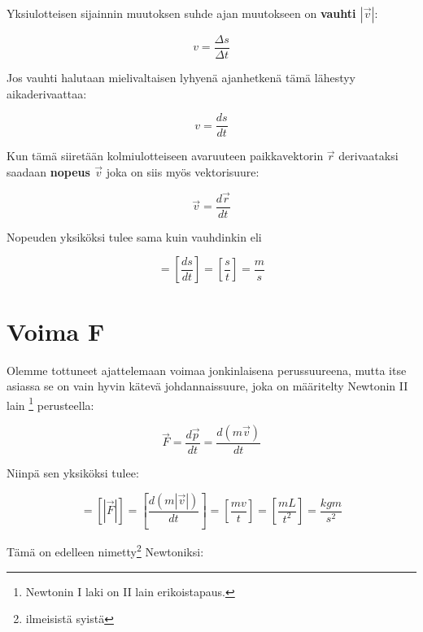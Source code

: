 \documentclass[12pt,a4paper,finnish]{book}
\begin{document}
Yksiulotteisen sijainnin muutoksen suhde ajan muutokseen on \textbf{vauhti $|\vec{v}|$}:

\begin{equation}
 v = \frac{\Delta s}{\Delta t}
\end{equation}

Jos vauhti halutaan mielivaltaisen lyhyenä ajanhetkenä tämä lähestyy aikaderivaattaa:

\begin{equation}
 v = \frac{ds}{dt}
\end{equation}

Kun tämä siiretään kolmiulotteiseen avaruuteen paikkavektorin $\vec{r}$ derivaataksi saadaan \textbf{nopeus $\vec{v}$} 
joka on siis myös vektorisuure:

\begin{equation}
 \vec{v} = \frac{d\vec{r}}{dt}
\end{equation}

Nopeuden yksiköksi tulee sama kuin vauhdinkin eli

\begin{equation}
 [v] = \left[\frac{ds}{dt}\right] = \left[\frac{s}{t}\right] = \frac{m}{s}
\end{equation}


\section{Voima F} %

Olemme tottuneet ajattelemaan voimaa jonkinlaisena perussuureena, mutta itse asiassa se on vain hyvin kätevä 
johdannaissuure, joka on määritelty Newtonin II lain \footnote{Newtonin I laki on II lain erikoistapaus.} perusteella:

\begin{equation}
 \vec{F} = \frac{d\vec{p}}{dt} = \frac{d(m\vec{v})}{dt}
\end{equation}

Niinpä sen yksiköksi tulee:

\begin{equation}
 [F] = [|\vec{F}|] = \left[\frac{d(m|\vec{v}|)}{dt}\right] = \left[\frac{mv}{t}\right] 
  = \left[\frac{mL}{t^2}\right] = \frac{kgm}{s^2}
\end{equation}

Tämä on edelleen nimetty\footnote{ilmeisistä syistä} Newtoniksi:
\end{document}
